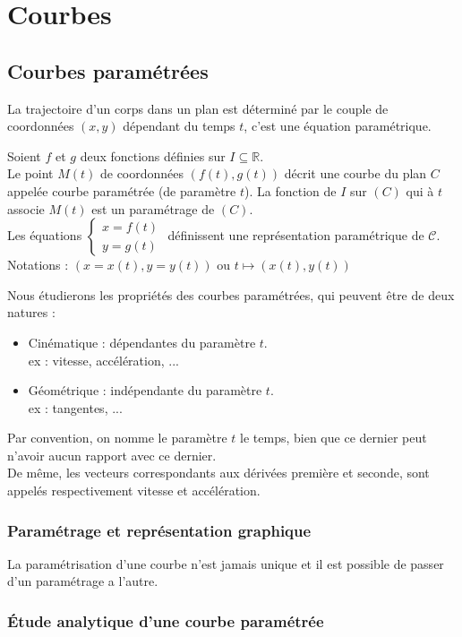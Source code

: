 \part{Courbes}
\chapter{Courbes paramétrées}
La trajectoire d'un corps dans un plan est déterminé par le couple de coordonnées $(x,y)$ dépendant du temps $t$, c'est une équation paramétrique.
\begin{defi}
Soient $f$ et $g$ deux fonctions définies sur $I\subseteq
\mathbb{R}$.\\
Le point $M(t)$ de coordonnées $(f(t),g(t))$ décrit une courbe du plan $C$ appelée courbe paramétrée (de paramètre $t$).
La fonction de $I$ sur $(C)$ qui à $t$ associe $M(t)$ est un paramétrage de $(C)$.\\
Les équations $\begin{cases}x=f(t)\\y=g(t)\end{cases}$ définissent une représentation paramétrique de $\mathscr{C}$.\\
Notations : $(x=x(t),y=y(t))$ ou $t\mapsto(x(t),y(t))$
\end{defi}
Nous étudierons les propriétés des courbes paramétrées, qui peuvent être de deux natures :
\begin{itemize}
    \item Cinématique : dépendantes du paramètre $t$.\\
    ex : vitesse, accélération, ...
    \item Géométrique : indépendante du paramètre $t$.\\
    ex : tangentes, ...
\end{itemize}
\begin{rmq}
Par convention, on nomme le paramètre $t$ le temps, bien que ce dernier peut n'avoir aucun rapport avec ce dernier.\\
De même, les vecteurs correspondants aux dérivées première et seconde, sont appelés respectivement vitesse et accélération.
\end{rmq}
\section{Paramétrage et représentation graphique}
La paramétrisation d'une courbe n'est jamais unique et il est possible de passer d'un paramétrage a l'autre.
\section{Étude analytique d'une courbe paramétrée}
